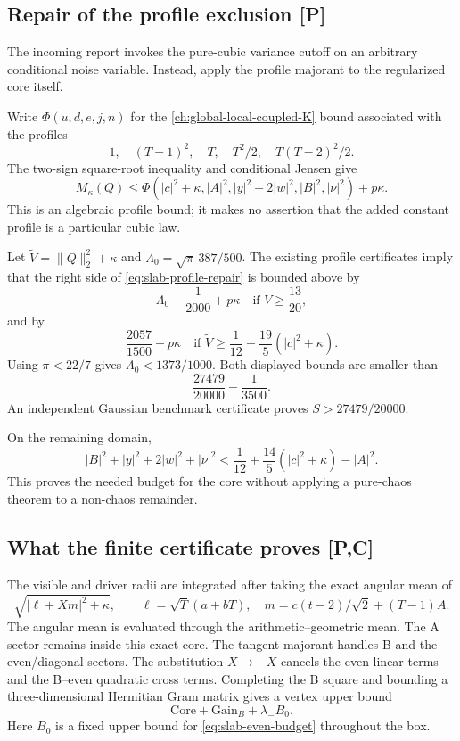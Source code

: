 \subsection{Repair of the profile exclusion [P]}
The incoming report invokes the pure-cubic variance cutoff on an
arbitrary conditional noise variable. Instead, apply the profile
majorant to the regularized core itself.

Write \(\Phi(u,d,e,j,n)\) for the \autoref{ch:global-local-coupled-K} bound associated with the
profiles
\[
1,\quad (T-1)^2,\quad T,\quad T^2/2,\quad T(T-2)^2/2.
\]
The two-sign square-root inequality and conditional Jensen give
\begin{equation}
M_\kappa(Q)\le
\Phi(|c|^2+\kappa,|A|^2,|y|^2+2|w|^2,|B|^2,|\nu|^2)
+p\kappa.
\label{eq:slab-profile-repair}
\end{equation}
This is an algebraic profile bound; it makes no assertion that the
added constant profile is a particular cubic law.

Let \(\widetilde V=\|Q\|_2^2+\kappa\) and
\(\Lambda_0=\sqrt\pi\,387/500\).
The existing profile certificates imply that the right side of
\eqref{eq:slab-profile-repair} is bounded above by
\[
\Lambda_0-\frac1{2000}+p\kappa
\quad\text{if }\widetilde V\ge\frac{13}{20},
\]
and by
\[
\frac{2057}{1500}+p\kappa
\quad\text{if }\widetilde V\ge
\frac1{12}+\frac{19}{5}(|c|^2+\kappa).
\]
Using \(\pi<22/7\) gives \(\Lambda_0<1373/1000\).
Both displayed bounds are smaller than
\[
\frac{27479}{20000}-\frac1{3500}.
\]
An independent Gaussian benchmark certificate proves
\(S>27479/20000\).

On the remaining domain,
\begin{equation}
|B|^2+|y|^2+2|w|^2+|\nu|^2
<\frac1{12}+\frac{14}{5}(|c|^2+\kappa)-|A|^2.
\label{eq:slab-even-budget}
\end{equation}
This proves the needed budget for the core without applying a
pure-chaos theorem to a non-chaos remainder.

\subsection{What the finite certificate proves [P,C]}
The visible and driver radii are integrated after taking the exact
angular mean of
\[
\sqrt{|\ell+Xm|^2+\kappa},\qquad
\ell=\sqrt T(a+bT),\quad
m=c(t-2)/\sqrt2+(T-1)A.
\]
The angular mean is evaluated through the arithmetic--geometric mean.
The A sector remains inside this exact core.
The tangent majorant handles B and the even/diagonal sectors.
The substitution \(X\mapsto-X\) cancels the even linear terms and the
B--even quadratic cross terms. Completing the B square and bounding a
three-dimensional Hermitian Gram matrix gives a vertex upper bound
\[
\mathrm{Core}+\mathrm{Gain}_B+\lambda_- B_0.
\]
Here \(B_0\) is a fixed upper bound for
\eqref{eq:slab-even-budget} throughout the box.

